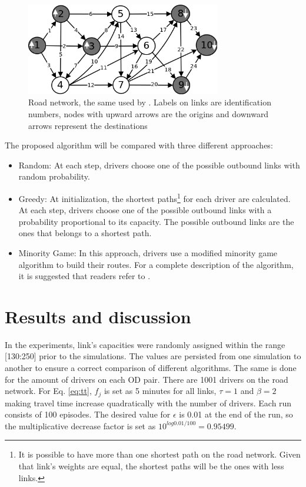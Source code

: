 \documentclass[12pt]{llncs}
\newcommand{\fftt}{\ensuremath{f_j}} 		%
\begin{document}
\begin{figure}[ht]
    \centerline{\includegraphics[width=8.5cm]{img/roadnetwork.png}}
    \caption{Road network, the same used by \cite{Galib&Moser2011}. Labels on links are identification numbers, nodes with upward arrows are the origins and downward arrows represent the destinations}
    \label{fig:roadnetwork}
\end{figure}

The proposed algorithm will be compared with three different approaches:

\begin{itemize}
  \item Random: At each step, drivers choose one of the possible outbound links with random probability.
  \item Greedy: At initialization, the shortest paths\footnote{It is possible to have more than one shortest path on the road network. Given that link's weights are equal, the shortest paths will be the ones with less links.} for each driver are calculated. At each step, drivers choose one of the possible outbound links with a probability proportional to its capacity. The possible outbound links are the ones that belongs to a shortest path. %
  \item Minority Game: In this approach, drivers use a modified minority game algorithm to build their routes. For a complete description of the algorithm, it is suggested that readers refer to \cite{Galib&Moser2011}.
\end{itemize}

\section{Results and discussion}
\label{sec:results}

In the experiments, link's capacities were randomly assigned within the range [130:250] prior to the simulations. The values are persisted from one simulation to another to ensure a correct comparison of different algorithms. The same is done for the amount of drivers on each OD pair. There are 1001 drivers on the road network. For Eq. \eqref{eq:tt}, $\fftt$ is set as 5 minutes for all links, $\tau = 1$ and $\beta = 2$ making travel time increase quadratically with the number of drivers. Each run consists of 100 episodes. The desired value for $\epsilon$ is 0.01 at the end of the run, so the multiplicative decrease factor is set as $10^{log 0.01 / 100} = 0.95499$.
\end{document}
